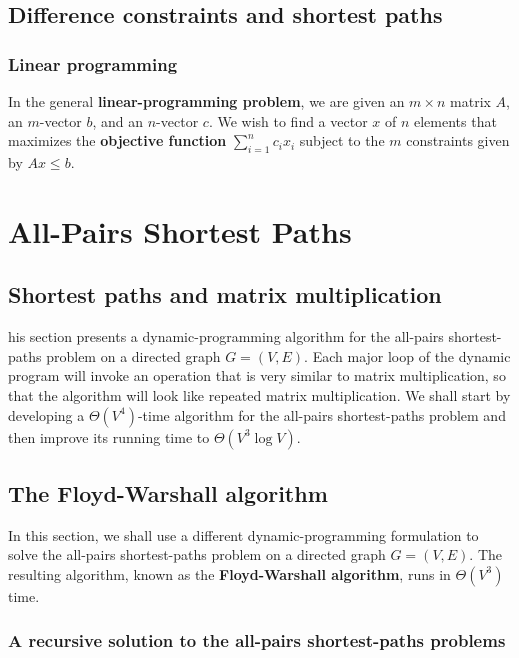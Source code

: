 \documentclass[12pt]{article}
\begin{document}
\subsection{Difference constraints and shortest paths}

\subsubsection*{Linear programming}

In the general \textbf{linear-programming problem}, we are given an $m \times n$ matrix $A$, an $m$-vector $b$, and an $n$-vector $c$. We wish to find a vector $x$ of $n$ elements that maximizes the \textbf{objective function} $\sum_{i=1}^n c_i x_i$ subject to the $m$ constraints given by $Ax \le b$.

\section{All-Pairs Shortest Paths}

\subsection{Shortest paths and matrix multiplication}

his section presents a dynamic-programming algorithm for the all-pairs shortest-paths problem on a directed graph $G = (V, E)$. Each major loop of the dynamic program will invoke an operation that is very similar to matrix multiplication, so that the algorithm will look like repeated matrix multiplication. We shall start by developing a $\Theta(V^4)$-time algorithm for the all-pairs shortest-paths problem and then improve its running time to $\Theta(V^3 \log V)$.

\subsection{The Floyd-Warshall algorithm}

In this section, we shall use a different dynamic-programming formulation to solve the all-pairs shortest-paths problem on a directed graph $G = (V,E)$. The resulting algorithm, known as the \textbf{Floyd-Warshall algorithm}, runs in $\Theta(V^3)$ time.

\subsubsection*{A recursive solution to the all-pairs shortest-paths problems}
\end{document}

